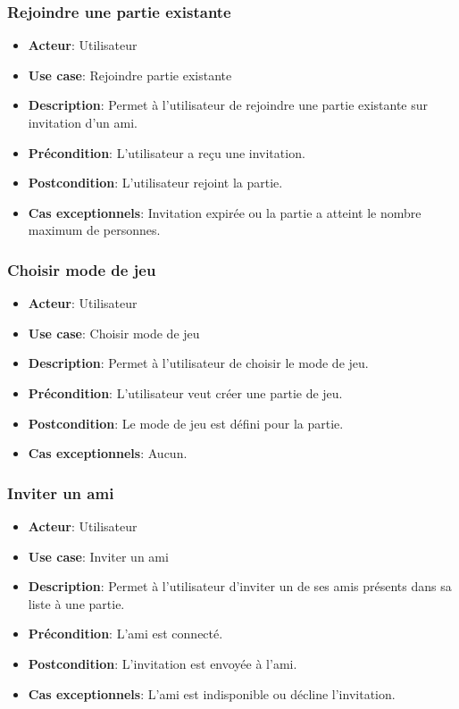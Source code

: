 \documentclass{article}
\begin{document}
\subsubsection*{Rejoindre une partie existante}
\begin{itemize}
    \item \textbf{Acteur}: Utilisateur
    \item \textbf{Use case}: Rejoindre partie existante
    \item \textbf{Description}: Permet à l'utilisateur de rejoindre une partie existante sur invitation d'un ami.
    \item \textbf{Précondition}: L'utilisateur a reçu une invitation.
    \item \textbf{Postcondition}: L'utilisateur rejoint la partie.
    \item \textbf{Cas exceptionnels}: Invitation expirée ou la partie a atteint le nombre maximum de personnes.
\end{itemize}

\subsubsection*{Choisir mode de jeu}
\begin{itemize}
    \item \textbf{Acteur}: Utilisateur
    \item \textbf{Use case}: Choisir mode de jeu
    \item \textbf{Description}: Permet à l'utilisateur de choisir le mode de jeu.
    \item \textbf{Précondition}: L'utilisateur veut créer une partie de jeu.
    \item \textbf{Postcondition}: Le mode de jeu est défini pour la partie.
    \item \textbf{Cas exceptionnels}: Aucun.
\end{itemize}

\subsubsection*{Inviter un ami}
\begin{itemize}
    \item \textbf{Acteur}: Utilisateur
    \item \textbf{Use case}: Inviter un ami
    \item \textbf{Description}: Permet à l'utilisateur d'inviter un de ses amis présents dans sa liste à une partie.
    \item \textbf{Précondition}: L'ami est connecté.
    \item \textbf{Postcondition}: L'invitation est envoyée à l'ami.
    \item \textbf{Cas exceptionnels}: L'ami est indisponible ou décline l'invitation.
\end{itemize}
\end{document}
